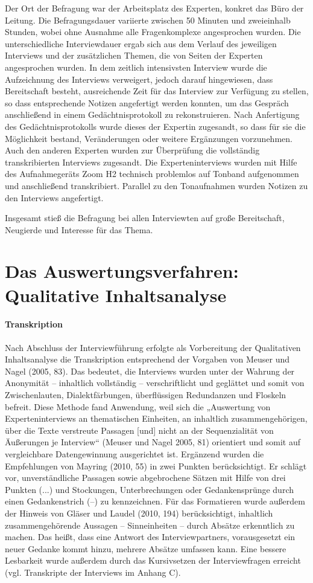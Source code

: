 Der Ort der Befragung war der Arbeitsplatz des Experten, konkret das Büro der Leitung. Die Befragungsdauer variierte zwischen 50 Minuten und zweieinhalb Stunden, wobei ohne Ausnahme alle Fragenkomplexe angesprochen wurden. Die unterschiedliche Interviewdauer ergab sich aus dem Verlauf des jeweiligen Interviews und der zusätzlichen Themen, die von Seiten der Experten angesprochen wurden. In dem zeitlich intensivsten Interview wurde die Aufzeichnung des Interviews verweigert, jedoch darauf hingewiesen, dass Bereitschaft besteht, ausreichende Zeit für das Interview zur Verfügung zu stellen, so dass entsprechende Notizen angefertigt werden konnten, um das Gespräch anschließend in einem Gedächtnisprotokoll zu rekonstruieren. Nach Anfertigung des Gedächtnisprotokolls wurde dieses der Expertin zugesandt, so dass für sie die Möglichkeit bestand, Veränderungen oder weitere Ergänzungen vorzunehmen. Auch den anderen Experten wurden zur Überprüfung die vollständig transkribierten Interviews zugesandt. 
Die Experteninterviews wurden mit Hilfe des Aufnahmegeräts Zoom H2 technisch problemlos auf Tonband aufgenommen und anschließend transkribiert. Parallel zu den Tonaufnahmen wurden Notizen zu den Interviews angefertigt. 

Insgesamt stieß die Befragung bei allen Interviewten auf große Bereitschaft, Neugierde und Interesse für das Thema.

\section{Das Auswertungsverfahren: Qualitative Inhaltsanalyse}

\paragraph{Transkription} Nach Abschluss der Interviewführung erfolgte als Vorbereitung der Qualitativen Inhaltsanalyse die Transkription entsprechend der Vorgaben von Meuser und Nagel (2005, 83). Das bedeutet, die Interviews wurden unter der Wahrung der Anonymität -- inhaltlich vollständig -- verschriftlicht und geglättet und somit von Zwischenlauten, Dialektfärbungen, überflüssigen Redundanzen und Floskeln befreit. Diese Methode fand Anwendung, weil sich die „Auswertung von Experteninterviews an thematischen Einheiten, an inhaltlich zusammengehörigen, über die Texte verstreute Passagen [und] nicht an der Sequenzialität von Äußerungen je Interview“ (Meuser und Nagel 2005, 81) orientiert und somit auf vergleichbare Datengewinnung ausgerichtet ist. 
Ergänzend wurden die Empfehlungen von Mayring (2010, 55) in zwei Punkten berücksichtigt. Er schlägt vor, unverständliche Passagen sowie abgebrochene Sätzen mit Hilfe von drei Punkten (...) und Stockungen, Unterbrechungen oder Gedankensprünge durch einen Gedankenstrich (--) zu kennzeichnen. 
Für das Formatieren wurde außerdem der Hinweis von Gläser und Laudel (2010, 194) berücksichtigt, inhaltlich zusammengehörende Aussagen -- Sinneinheiten -- durch Absätze erkenntlich zu machen. Das heißt, dass eine Antwort des Interviewpartners, vorausgesetzt ein neuer Gedanke kommt hinzu, mehrere Absätze umfassen kann. Eine bessere Lesbarkeit wurde außerdem durch das Kursivsetzen der Interviewfragen erreicht (vgl. Transkripte der Interviews im Anhang C). 

